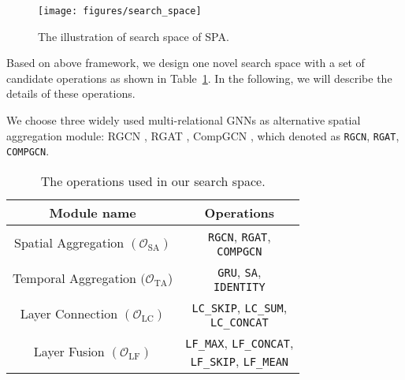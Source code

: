 \documentclass[11pt]{article}
\begin{document}
\begin{figure}[t]
	\centering
	\texttt{[image: figures/search\_space]}
	\caption{The illustration of search space of SPA.}
	\label{fig-search_space}
	\vspace{-8px}
\end{figure}

Based on above framework, 
we design one novel search space with a set of candidate operations 
as shown in Table~\ref{tab-search-space}. 
In the following, 
we will describe the details of these operations.

 We choose three widely used multi-relational GNNs as alternative spatial aggregation module: RGCN \citep{schlichtkrull2018modeling}, RGAT \citep{busbridge2019relational}, CompGCN \citep{vashishth2020composition}, which denoted as \texttt{RGCN}, \texttt{RGAT}, \texttt{COMPGCN}.

\begin{table}[tb]
	\centering
	\setlength\tabcolsep{3.5pt}
	\begin{tabular}{cc}
		\toprule
		\textbf{Module name} & \textbf{Operations}               \\
		\midrule
		\makecell[c]{Spatial Aggregation  \\ $(\mathcal{O}_\text{SA})$}  & \makecell[c]{\texttt{RGCN}, \texttt{RGAT},  \\ \texttt{COMPGCN}}                              \\
		\makecell[c]{Temporal Aggregation \\$(\mathcal{O}_\text{TA}$)} & \makecell[c]{\texttt{GRU}, \texttt{SA}, \\ \texttt{IDENTITY}}                                \\
		\makecell[c]{Layer Connection \\$(\mathcal{O}_\text{LC})$}     & \makecell[c]{\texttt{LC\_SKIP}, \texttt{LC\_SUM}, \\ \texttt{LC\_CONCAT}}                    \\
		\makecell[c]{Layer Fusion \\$(\mathcal{O}_\text{LF})$}         & \makecell[c]{\texttt{LF\_MAX}, \texttt{LF\_CONCAT},\\ \texttt{LF\_SKIP}, \texttt{LF\_MEAN}} \\
		\bottomrule
	\end{tabular}
\caption{The operations used in our search space.}
	\label{tab-search-space}
	\vspace{-8px}
\end{table}
\end{document}
